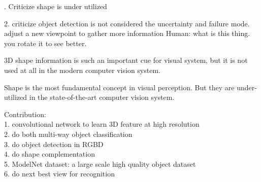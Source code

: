 \documentclass[10pt,twocolumn,letterpaper]{article}
\begin{document}
\iffalse
View planning, a.k.a. the Next-Best-View problem, 
has been extensively studied \cite{NBVsurveys} in the literature of 3D model acquisition in Computer Graphics, 
where the goal is to reconstruct the 3D surface completely and accurately using range scans. 
It desires a next view to have enough overlap with current known space so that reconstruction could be registered very accurately \cite{krainin2011autonomous, pito1995solution} while exploring unknown spaces as much as possible at the same time \cite{fisher1999next, wong1999next}. The Best-Next-View for reconstruction find the trade-off between these two factors.
However, in our case, we look for the best next-view that potentially makes the discriminative information for object recognition visible.
We do not need to reconstruct the whole 3D object accurately in order to recognize it, and this makes Next-Best-View for recognition unique. 
For 3D model acquisition, researchers have used shape completion technique to refine the model \cite{pauly2005example, ramamoorthi1999creating}. 
In our case, we samples different shapes for completion to predict the Next-Best-View for recognition.
\fi







. Criticize shape is under utilized

2. criticize object detection is not considered the uncertainty and failure mode.
adjust a new viewpoint to gather more information
Human: what is this thing. you rotate it to see better.


3D shape information is such an important cue for visual system, 
but it is not used at all in the modern computer vision system.

Shape is the most fundamental concept in visual perception.
But they are under-utilized  in the state-of-the-art computer vision system.

Contribution:\\
1. convolutional network to learn 3D feature at high resolution \\
2. do both multi-way object classification\\
3. do object detection in RGBD\\
4. do shape complementation\\
5. ModelNet dataset: a large scale high quality object dataset\\
6. do next best view for recognition\\
\end{document}
